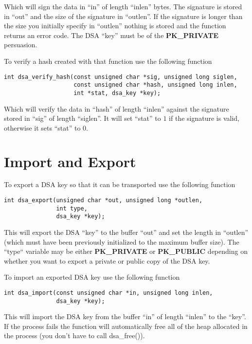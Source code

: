 \documentclass[a4paper]{book}
\begin{document}
Which will sign the data in ``in'' of length ``inlen'' bytes.  The signature is stored in ``out'' and the size
of the signature in ``outlen''.  If the signature is longer than the size you initially specify in ``outlen'' nothing
is stored and the function returns an error code.  The DSA ``key'' must be of the \textbf{PK\_PRIVATE} persuasion.

To verify a hash created with that function use the following function

\begin{verbatim}
int dsa_verify_hash(const unsigned char *sig, unsigned long siglen,
                    const unsigned char *hash, unsigned long inlen, 
                    int *stat, dsa_key *key);
\end{verbatim}
Which will verify the data in ``hash'' of length ``inlen'' against the signature stored in ``sig'' of length ``siglen''.  
It will set ``stat'' to $1$ if the signature is valid, otherwise it sets ``stat'' to $0$.  

\section{Import and Export}

To export a DSA key so that it can be transported use the following function
\begin{verbatim}
int dsa_export(unsigned char *out, unsigned long *outlen, 
               int type, 
               dsa_key *key);
\end{verbatim}
This will export the DSA ``key'' to the buffer ``out'' and set the length in ``outlen'' (which must have been previously
initialized to the maximum buffer size).  The ``type`` variable may be either \textbf{PK\_PRIVATE} or \textbf{PK\_PUBLIC}
depending on whether you want to export a private or public copy of the DSA key.

To import an exported DSA key use the following function

\begin{verbatim}
int dsa_import(const unsigned char *in, unsigned long inlen, 
               dsa_key *key);
\end{verbatim}

This will import the DSA key from the buffer ``in'' of length ``inlen'' to the ``key''.  If the process fails the function
will automatically free all of the heap allocated in the process (you don't have to call dsa\_free()).  
\end{document}
